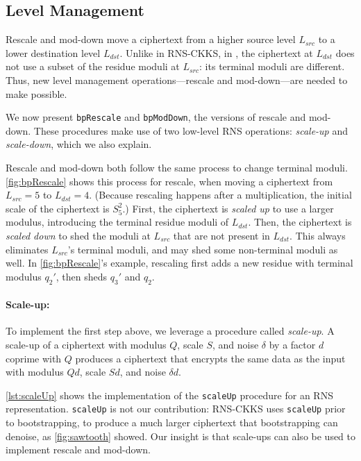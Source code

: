 \subsection{Level Management}
\label{sec:levelMgmt}

\figBpRescale

Rescale and mod-down move a ciphertext from a higher source level $L_{src}$ to
a lower destination level $L_{dst}$.
Unlike in RNS-CKKS, in \name, the ciphertext at $L_{dst}$ does not use a subset
of the residue moduli at $L_{src}$: its terminal moduli are different.
Thus, new level management operations---rescale and mod-down---are needed
to make \name possible.

We now present \texttt{bpRescale} and \texttt{bpModDown},
the \name versions of rescale and mod-down.
These procedures make use of two low-level RNS operations: \emph{scale-up} and
\emph{scale-down}, which we also explain.

Rescale and mod-down both follow the same process to change terminal
moduli.
\autoref{fig:bpRescale} shows this process for rescale, when moving a
ciphertext from $L_{src}=5$ to $L_{dst}=4$.
(Because rescaling happens after a multiplication, the initial scale of the
ciphertext is $S_5^2$.)
First, the ciphertext is \emph{scaled up} to use a larger modulus, introducing
the terminal residue moduli of $L_{dst}$.
Then, the ciphertext is \emph{scaled down} to shed the moduli at $L_{src}$ that
are not present in  $L_{dst}$.
This always eliminates $L_{src}$'s terminal moduli, and may shed some
non-terminal moduli as well.
In \autoref{fig:bpRescale}'s example, rescaling first adds a new residue with
terminal modulus $q_2'$, then sheds $q_3'$ and $q_2$.



\paragraph{Scale-up:} To implement the first step above, we
leverage a procedure called \emph{scale-up}.
A scale-up of a ciphertext with modulus $Q$, scale $S$, and noise $\delta$ by a
factor $d$ coprime with $Q$ produces a ciphertext that encrypts the same data
as the input with modulus $Qd$, scale $Sd$, and noise $\delta d$.

\autoref{lst:scaleUp} shows the implementation of the \texttt{scaleUp}
procedure for an RNS representation.
\texttt{scaleUp} is not our contribution: RNS-CKKS uses \texttt{scaleUp} prior
to bootstrapping, to produce a much larger ciphertext that bootstrapping can
denoise, as \autoref{fig:sawtooth} showed.
Our insight is that scale-ups can also be used to implement rescale and
mod-down.

